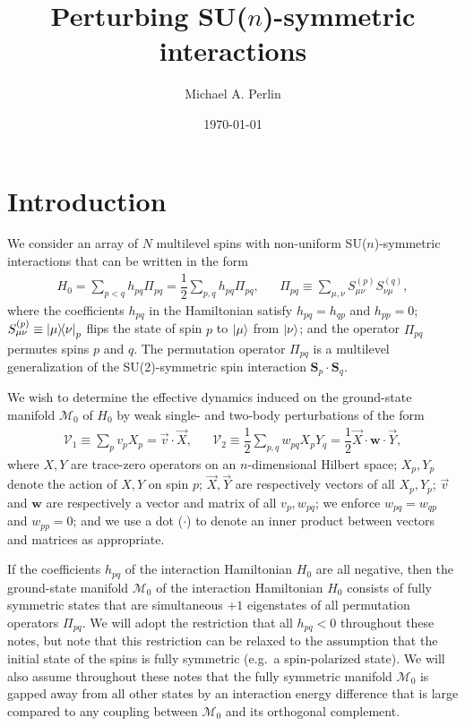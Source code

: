 \documentclass[nofootinbib,notitlepage,11pt]{revtex4-2}
\newcommand{\f}[2]{\dfrac{#1}{#2}} %
\renewcommand{\c}{\cdot} %
\newcommand{\m}{\bm} %
\renewcommand{\v}{\vec} %
\newcommand{\1}{\mathds{1}}
\newcommand{\M}{\mathcal{M}}
\newcommand{\V}{\mathcal{V}}
\begin{document}
\title{Perturbing SU($n$)-symmetric interactions}%
\author{Michael A. Perlin}%
\date{\today}

\maketitle

\tableofcontents

\section{Introduction}

We consider an array of $N$ multilevel spins with non-uniform
SU($n$)-symmetric interactions that can be written in the form
\begin{align}
  H_0 = \sum_{p<q} h_{pq} \Pi_{pq}
  = \f12 \sum_{p,q} h_{pq} \Pi_{pq},
  &&
  \Pi_{pq} \equiv \sum_{\mu,\nu} S_{\mu\nu}^{(p)} S_{\nu\mu}^{(q)},
  \label{eq:ints}
\end{align}
where the coefficients $h_{pq}$ in the Hamiltonian satisfy
$h_{pq}=h_{qp}$ and $h_{pp}=0$;
$S_{\mu\nu}^{(p)}\equiv\op{\mu}{\nu}_p$ flips the state of spin $p$ to
$\ket\mu$ from $\ket\nu$; and the operator $\Pi_{pq}$ permutes spins
$p$ and $q$.  The permutation operator $\Pi_{pq}$ is a multilevel
generalization of the SU(2)-symmetric spin interaction
$\m S_p\c\m S_q$.

We wish to determine the effective dynamics induced on the
ground-state manifold $\M_0$ of $H_0$ by weak single- and two-body
perturbations of the form
\begin{align}
  \V_1 \equiv \sum_p v_p X_p = \v v\c\v X,
  &&
  \V_2 \equiv \f12 \sum_{p,q} w_{pq} X_p Y_q
  = \f12 \v X \c\m w \c\v Y,
  \label{eq:perturbations}
\end{align}
where $X,Y$ are trace-zero operators on an $n$-dimensional Hilbert
space; $X_p,Y_p$ denote the action of $X,Y$ on spin $p$; $\v X,\v Y$
are respectively vectors of all $X_p,Y_p$; $\v v$ and $\m w$ are
respectively a vector and matrix of all $v_p,w_{pq}$; we enforce
$w_{pq}=w_{qp}$ and $w_{pp}=0$; and we use a dot ($\c$) to denote an
inner product between vectors and matrices as appropriate.

If the coefficients $h_{pq}$ of the interaction Hamiltonian $H_0$ are
all negative, then the ground-state manifold $\M_0$ of the interaction
Hamiltonian $H_0$ consists of fully symmetric states that are
simultaneous $+1$ eigenstates of all permutation operators $\Pi_{pq}$.
We will adopt the restriction that all $h_{pq}<0$ throughout these
notes, but note that this restriction can be relaxed to the assumption
that the initial state of the spins is fully symmetric (e.g.~a
spin-polarized state).  We will also assume throughout these notes
that the fully symmetric manifold $\M_0$ is gapped away from all other
states by an interaction energy difference that is large compared to
any coupling between $\M_0$ and its orthogonal complement.
\end{document}

